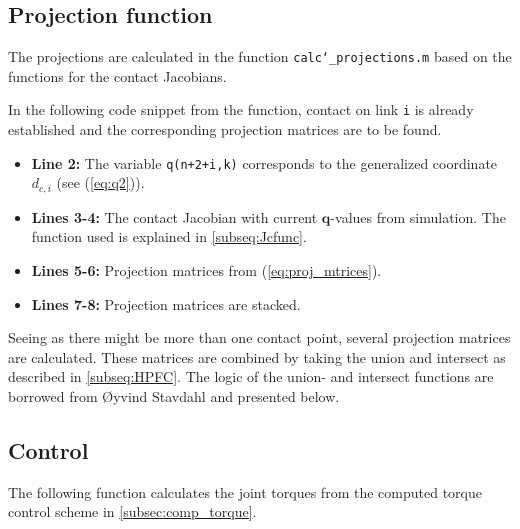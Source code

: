 
\subsection{Projection function}

The projections are calculated in the function \texttt{calc\char`_projections.m} based on the functions for the contact Jacobians. 

In the following code snippet from the function, contact on link \texttt{i} is already established and the corresponding projection matrices are to be found.

\begin{itemize}
    \item \textbf{Line 2:} The variable \texttt{q(n+2+i,k)} corresponds to the generalized coordinate $d_{c,i}$ (see (\ref{eq:q2})).
    \item \textbf{Lines 3-4:} The contact Jacobian with current $\mathbf{q}$-values from simulation. The function used is explained in \ref{subseq:Jcfunc}.
    \item \textbf{Lines 5-6:} Projection matrices from (\ref{eq:proj_mtrices}).
    \item \textbf{Lines 7-8:} Projection matrices are stacked.
\end{itemize}




Seeing as there might be more than one contact point, several projection matrices are calculated. These matrices are combined by taking the union and intersect as described in \ref{subseq:HPFC}. The logic of the union- and intersect functions are borrowed from Øyvind Stavdahl and presented below.




\subsection{Control}
The following function calculates the joint torques from the computed torque control scheme in \ref{subsec:comp_torque}.

